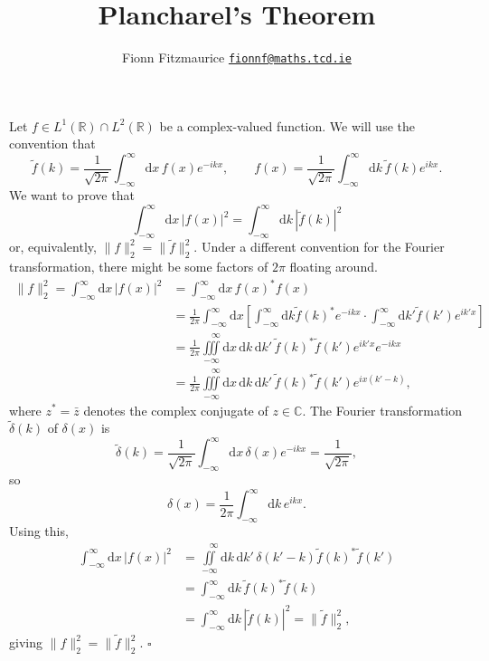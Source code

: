 \documentclass[11pt, a4paper]{article}
\title{Plancharel's Theorem}
\author{Fionn Fitzmaurice \hspace{20pt} \normalsize{\href{mailto:fionnf@maths.tcd.ie}{\texttt{fionnf@maths.tcd.ie}}}}
\date{}
\renewcommand{\d}{\ensuremath{\mathrm{d}}}
\begin{document}
\maketitle
\thispagestyle{empty}

\noindent Let $f \in L^{\!1}(\mathbb{R}) \cap L^{\!2}(\mathbb{R})$ be a complex-valued function. We will use the convention that
\[
\tilde{f}(k) = \frac{1}{\sqrt{2\pi}} \int_{-\infty}^\infty \!\! \d x\, f(x) e^{-ikx},\qquad f(x) = \frac{1}{\sqrt{2\pi}} \int_{-\infty}^\infty \!\! \d k\, \tilde{f}(k) e^{ikx}.
\]
We want to prove that 
\[
\int_{-\infty}^\infty \!\! \d x\, \lvert f(x) \rvert^2 = \int_{-\infty}^\infty \!\! \d k \, |\tilde{f}(k)|^2
\]
or, equivalently, $\lVert f \rVert_2^2 = \lVert \tilde{f} \rVert_2^2$. Under a different convention for the Fourier transformation, there might be some factors of $2\pi$ floating around.
\begin{align*}
\lVert f \rVert_2^2 = \int_{-\infty}^\infty \!\! \d x\, |f(x)|^2 &= \int_{-\infty}^\infty \!\! \d x\, f(x)^* f(x) \\
    &= \frac{1}{2\pi} \int_{-\infty}^\infty \!\! \d x \left[  \int_{-\infty}^\infty \!\! \d k \tilde{f}(k)^* e^{-ikx} \cdot \int_{-\infty}^\infty \!\! \d k' \tilde{f}(k') e^{ik'\!x} \right] \\
    &= \frac{1}{2\pi} \iiint\limits_{-\infty}^{\quad\infty} \d x\, \d k\, \d k'\, \tilde{f}(k)^* \tilde{f}(k') e^{ik'\!x} e^{-ikx} \\
    &= \frac{1}{2\pi} \iiint\limits_{-\infty}^{\quad\infty} \d x\, \d k\, \d k'\, \tilde{f}(k)^* \tilde{f}(k') e^{ix(k'\! - k)},
\end{align*}
where $z^*\! = \bar{z}$ denotes the complex conjugate of $z \in \mathbb{C}$.
The Fourier transformation $\tilde{\delta}(k)$ of $\delta(x)$ is
\[
\tilde{\delta}(k) = \frac{1}{\sqrt{2\pi}} \int_{-\infty}^\infty \!\! \d x\, \delta(x) e^{-ikx} = \frac{1}{\sqrt{2\pi}},
\]
so 
\[
\delta(x) = \frac{1}{2\pi} \int_{-\infty}^\infty \!\! \d k\, e^{ikx}.
\]
Using this,
\begin{align*}
\int_{-\infty}^\infty \!\! \d x\, |f(x)|^2 &=  \iint\limits_{-\infty}^{\quad\infty} \d k\, \d k'\, \delta(k'\! - k) \tilde{f}(k)^* \tilde{f}(k') \\
    &= \int_{-\infty}^\infty \!\! \d k\, \tilde{f}(k)^* \tilde{f}(k) \\
    &= \int_{-\infty}^\infty \!\! \d k\, |\tilde{f}(k)|^2 = \lVert \tilde{f} \rVert_2^2,
\end{align*}
giving $\lVert f \rVert_2^2 = \lVert \tilde{f} \rVert_2^2$. \hfill $\square$
\end{document}
